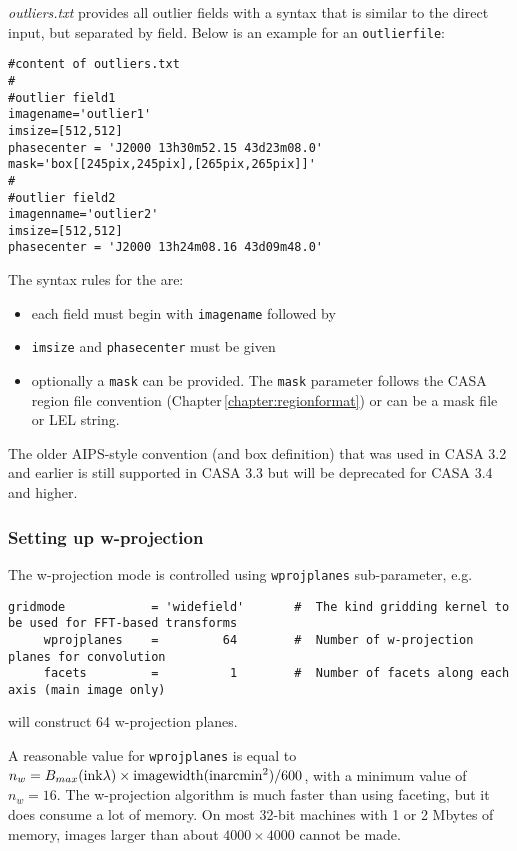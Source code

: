 {\it outliers.txt} provides all outlier fields with a syntax that is
similar to the direct input, but separated by field. Below is an
example for an {\tt outlierfile}:

\small
\begin{verbatim}
#content of outliers.txt
#
#outlier field1
imagename='outlier1'
imsize=[512,512]
phasecenter = 'J2000 13h30m52.15 43d23m08.0'
mask='box[[245pix,245pix],[265pix,265pix]]'
#
#outlier field2
imagenname='outlier2'
imsize=[512,512]
phasecenter = 'J2000 13h24m08.16 43d09m48.0'
\end{verbatim}
\normalsize

The syntax rules for the are:
\begin{itemize}
\item each field must begin with {\tt imagename} followed by 
\item {\tt imsize} and {\tt phasecenter} must be given
\item optionally a {\tt mask} can be provided. The {\tt mask}
  parameter follows the CASA region file convention
  (Chapter\,\ref{chapter:regionformat}) or can be a mask file or LEL
  string.
\end{itemize}


The older AIPS-style convention (and box definition) that was used in
CASA 3.2 and earlier is still supported in CASA 3.3 but will be
deprecated for CASA 3.4 and higher.

\subsubsection{Setting up w-projection}
\label{section:im.clean.widefield.wproj}

The w-projection mode is controlled using {\tt wprojplanes}
sub-parameter, e.g. 
\small
\begin{verbatim}
gridmode            = 'widefield'       #  The kind gridding kernel to be used for FFT-based transforms
     wprojplanes    =         64        #  Number of w-projection planes for convolution
     facets         =          1        #  Number of facets along each axis (main image only)
\end{verbatim}
\normalsize
will construct 64 w-projection planes.

A reasonable value for {\tt wprojplanes} is equal to $n_w = B_{max}({\rm in k}\lambda)
\times {\rm imagewidth}({\rm in arcmin}^2) / 600$, with a minimum value of $n_w=16$.  The
w-projection algorithm is much faster than using faceting, but it does
consume a lot of memory.  On most 32-bit machines with 1 or 2 Mbytes
of memory, images larger than about $4000\times 4000$ cannot be made.

